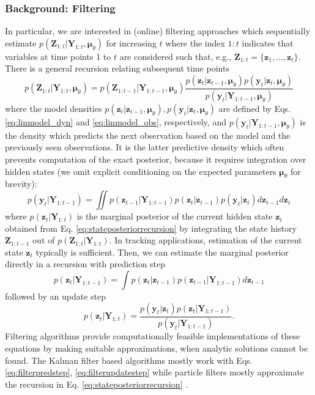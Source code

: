 \documentclass[a4paper,10pt]{article}
\newcommand{\bs}[1]{\mathbf{#1}}					%
\newcommand{\bgs}[1]{\boldsymbol{#1}}				%
\newcommand{\eq}[1]{\begin{equation} #1 \end{equation}}%
\renewcommand{\ss}{z}         %
\newcommand{\so}{y}         %
\newcommand{\spm}{\mu}    %
\renewcommand{\sp}{\theta}    %
\newcommand{\ps}{\bs{\ss}}    %
\newcommand{\po}{\bs{\so}}    %
\newcommand{\ppm}{\bgs{\spm}}   %
\newcommand{\Ps}{\bs{Z}}    %
\newcommand{\Po}{\bs{Y}}    %
\begin{document}
\subsubsection{Background: Filtering}
In particular, we are interested in (online) filtering approaches which sequentially estimate $p(\Ps_{1:t}|\Po_{1:t},\ppm_\sp)$ for increasing $t$ where the index $1:t$ indicates that variables at time points 1 to $t$ are considered such that, e.g., $\Ps_{1:t} = \{\ps_1, \dots, \ps_t\}$. There is a general recursion relating subsequent time points \cite[see e.g.][]{Doucet2011}
\eq{
    \label{eq:stateposteriorrecursion} p(\Ps_{1:t}|\Po_{1:t},\ppm_\sp) = p(\Ps_{1:t-1}|\Po_{1:t-1},\ppm_\sp)\frac{p(\ps_t|\ps_{t-1},\ppm_\sp)p(\po_t|\ps_t,\ppm_\sp)}{p(\po_t|\Po_{1:t-1},\ppm_\sp)}
}
where the model densities $p(\ps_t|\ps_{t-1},\ppm_\sp), p(\po_t|\ps_t,\ppm_\sp)$ are defined by Eqs. \ref{eq:linmodel_dyn} and \ref{eq:linmodel_obs}, respectively, and $p(\po_t|\Po_{1:t-1},\ppm_\sp)$ is the density which predicts the next observation based on the model and the previously seen observations. It is the latter predictive density which often prevents computation of the exact posterior, because it requires integration over hidden states (we omit explicit conditioning on the expected parameters $\ppm_\sp$ for brevity):
\eq{
    p(\po_t|\Po_{1:t-1}) = \iint p(\ps_{t-1}|\Po_{1:t-1}) p(\ps_t|\ps_{t-1}) p(\po_t|\ps_t) d\ps_{t-1} d\ps_t
}
where $p(\ps_t|\Po_{1:t})$ is the marginal posterior of the current hidden state $\ps_t$ obtained from Eq. \ref{eq:stateposteriorrecursion} by integrating the state history $\Ps_{1:t-1}$ out of $p(\Ps_{1:t}|\Po_{1:t})$. In tracking applications, estimation of the current state $\ps_t$ typically is sufficient. Then, we can estimate the marginal posterior directly in a recursion with prediction step
\eq{
    \label{eq:filterpredstep} p(\ps_t|\Po_{1:t-1}) = \int p(\ps_t|\ps_{t-1}) p(\ps_{t-1}|\Po_{1:t-1}) d\ps_{t-1}
}
followed by an update step
\eq{
    \label{eq:filterupdatestep} p(\ps_t|\Po_{1:t}) = \frac{p(\po_t|\ps_t) p(\ps_t|\Po_{1:t-1})}{p(\po_t|\Po_{1:t-1})}.
}
Filtering algorithms provide computationally feasible implementations of these equations by making suitable approximations, when analytic solutions cannot be found. The Kalman filter based algorithms mostly work with Eqs. \ref{eq:filterpredstep}, \ref{eq:filterupdatestep} while particle filters mostly approximate the recursion in Eq. \ref{eq:stateposteriorrecursion} \cite{Doucet2011}.
\end{document}
